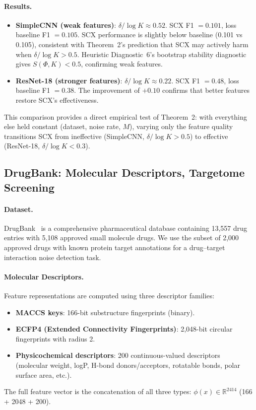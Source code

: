 \paragraph{Results.}
\begin{itemize}
    \item \textbf{SimpleCNN (weak features)}: $\delta / \log K \approx 0.52$. SCX F1 $= 0.101$, loss baseline F1 $= 0.105$. SCX performance is slightly below baseline (0.101 vs 0.105), consistent with Theorem~2's prediction that SCX may actively harm when $\delta / \log K > 0.5$. Heuristic Diagnostic~6's bootstrap stability diagnostic gives $S(\Phi, K) < 0.5$, confirming weak features.
    \item \textbf{ResNet-18 (stronger features)}: $\delta / \log K \approx 0.22$. SCX F1 $= 0.48$, loss baseline F1 $= 0.38$. The improvement of $+0.10$ confirms that better features restore SCX's effectiveness.
\end{itemize}

This comparison provides a direct empirical test of Theorem~2: with everything else held constant (dataset, noise rate, $M$), varying only the feature quality transitions SCX from ineffective (SimpleCNN, $\delta/\log K > 0.5$) to effective (ResNet-18, $\delta/\log K < 0.3$).

\subsection{DrugBank: Molecular Descriptors, Targetome Screening}

\paragraph{Dataset.}
DrugBank~\cite{wishart2018drugbank} is a comprehensive pharmaceutical database containing 13,557 drug entries with 5,108 approved small molecule drugs. We use the subset of 2,000 approved drugs with known protein target annotations for a drug--target interaction noise detection task.

\paragraph{Molecular Descriptors.}
Feature representations are computed using three descriptor families:
\begin{itemize}
    \item \textbf{MACCS keys}: 166-bit substructure fingerprints (binary).
    \item \textbf{ECFP4 (Extended Connectivity Fingerprints)}: 2,048-bit circular fingerprints with radius 2.
    \item \textbf{Physicochemical descriptors}: 200 continuous-valued descriptors (molecular weight, logP, H-bond donors/acceptors, rotatable bonds, polar surface area, etc.).
\end{itemize}
The full feature vector is the concatenation of all three types: $\phi(x) \in \mathbb{R}^{2414}$ (166 + 2048 + 200).

